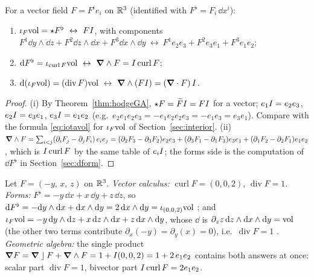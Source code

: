 \begin{proposition}\label{prop:threelang}
For a vector field $F=F^ie_i$ on $\mathbb{R}^3$ (identified with $F^\flat=F_i\,\dd x^i$):
\begin{enumerate}[label=(\roman*)]
\item $\iota_F\vol=\hodge F^\flat\ \leftrightarrow\ F\pss$, with components $F^1\dd y\wedge\dd z+F^2\dd z\wedge\dd x+F^3\dd x\wedge\dd y\ \leftrightarrow\ F^1e_2e_3+F^2e_3e_1+F^3e_1e_2$;
\item $\mathrm{d} F^\flat=\iota_{\operatorname{curl}F}\mathrm{vol}\ \leftrightarrow\ \boldsymbol{\nabla}\wedge F=I\operatorname{curl}F$;
\item $\dd(\iota_F\vol)=(\operatorname{div}F)\vol\ \leftrightarrow\ \vd\wedge(F\pss)=(\vd\cdot F)\,\pss$.
\end{enumerate}
\end{proposition}
\begin{proof}
(i) By Theorem~\ref{thm:hodgeGA}, $\star F=\widetilde{F}I=FI$ for a vector; $e_1I=e_2e_3$, $e_2I=e_3e_1$, $e_3I=e_1e_2$ (e.g.\ $e_2e_1e_2e_3=-e_1e_2e_2e_3=-e_1e_3=e_3e_1$). Compare with the formula \eqref{eq:iotavol} for $\iota_F\mathrm{vol}$ of Section~\ref{sec:interior}. (ii) $\boldsymbol{\nabla}\wedge F=\sum_{i<j}(\partial_iF_j-\partial_jF_i)\,e_ie_j=(\partial_2F_3-\partial_3F_2)e_2e_3+(\partial_3F_1-\partial_1F_3)e_3e_1+(\partial_1F_2-\partial_2F_1)e_1e_2$, which is $I\operatorname{curl}F$ by the same table of $e_iI$; the forms side is the computation of $\dd F^\flat$ in Section~\ref{sec:dform}.
\end{proof}

\begin{example}\label{ex:threelang}
Let $F=(-y,\,x,\,z)$ on $\mathbb{R}^3$. \emph{Vector calculus:} $\operatorname{curl}F=(0,0,2)$, $\operatorname{div}F=1$.
\emph{Forms:} $F^\flat=-y\,\dd x+x\,\dd y+z\,\dd z$, so $\mathrm{d} F^\flat=-\mathrm{d} y\wedge\mathrm{d} x+\mathrm{d} x\wedge\mathrm{d} y=2\,\mathrm{d} x\wedge\mathrm{d} y=\iota_{(0,0,2)}\mathrm{vol}$ \checkmark; and $\iota_F\mathrm{vol}=-y\,\mathrm{d} y\wedge\mathrm{d} z+x\,\mathrm{d} z\wedge\mathrm{d} x+z\,\mathrm{d} x\wedge\mathrm{d} y$, whose $\dd$ is $\partial_zz\,\mathrm{d} z\wedge\mathrm{d} x\wedge\mathrm{d} y=\mathrm{vol}$ (the other two terms contribute $\partial_x(-y)=\partial_y(x)=0$), i.e.\ $\operatorname{div}F=1$ \checkmark.
\emph{Geometric algebra:} the single product $\boldsymbol{\nabla} F=\boldsymbol{\nabla}\mathbin{\rfloor} F+\boldsymbol{\nabla}\wedge F=1+I(0,0,2)=1+2\,e_1e_2$ contains both answers at once: scalar part $\operatorname{div}F=1$, bivector part $I\operatorname{curl}F=2e_1e_2$.
\end{example}
